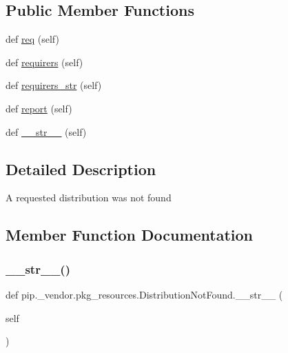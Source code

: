 \subsection*{Public Member Functions}
\begin{DoxyCompactItemize}
\item 
def \hyperlink{classpip_1_1__vendor_1_1pkg__resources_1_1DistributionNotFound_a544f707bf24ba1dd0358de79f6afc3fb}{req} (self)
\item 
def \hyperlink{classpip_1_1__vendor_1_1pkg__resources_1_1DistributionNotFound_aadf058b48626607ecb404e54b0f0663c}{requirers} (self)
\item 
def \hyperlink{classpip_1_1__vendor_1_1pkg__resources_1_1DistributionNotFound_abaafd40e1852271b6d0abbb81cec2dda}{requirers\+\_\+str} (self)
\item 
def \hyperlink{classpip_1_1__vendor_1_1pkg__resources_1_1DistributionNotFound_a705e143e486e4ae635f96c8e28ef2328}{report} (self)
\item 
def \hyperlink{classpip_1_1__vendor_1_1pkg__resources_1_1DistributionNotFound_a1b998586473db71c88826762c08b69ba}{\+\_\+\+\_\+str\+\_\+\+\_\+} (self)
\end{DoxyCompactItemize}


\subsection{Detailed Description}
\begin{DoxyVerb}A requested distribution was not found\end{DoxyVerb}
 

\subsection{Member Function Documentation}
\mbox{\label{classpip_1_1__vendor_1_1pkg__resources_1_1DistributionNotFound_a1b998586473db71c88826762c08b69ba}} 
\subsubsection{\texorpdfstring{\+\_\+\+\_\+str\+\_\+\+\_\+()}{\_\_str\_\_()}}
{\footnotesize\ttfamily def pip.\+\_\+vendor.\+pkg\+\_\+resources.\+Distribution\+Not\+Found.\+\_\+\+\_\+str\+\_\+\+\_\+ (\begin{DoxyParamCaption}\item[{}]{self }\end{DoxyParamCaption})}

